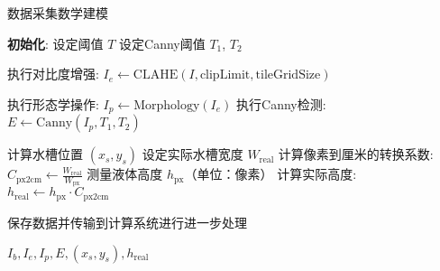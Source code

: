 \documentclass[UTF8,a4paper]{article}
\begin{document}
\begin{algorithm}[H]
    \caption{数据采集数学建模}
    
    \textbf{初始化}:  
    设定阈值 $T$\;
    设定Canny阈值 $T_1$, $T_2$\;
    
    执行对比度增强:  
    $I_e \leftarrow \text{CLAHE}(I, \text{clipLimit}, \text{tileGridSize})$\;
    
    执行形态学操作:  
    $I_p \leftarrow \text{Morphology}(I_e)$\;
    执行Canny检测:  
    $E \leftarrow \text{Canny}(I_p, T_1, T_2)$\;
    
    计算水槽位置 $(x_s, y_s)$\;
    设定实际水槽宽度 $W_{\text{real}}$\;
    计算像素到厘米的转换系数:  
    $C_{\text{px2cm}} \leftarrow \frac{W_{\text{real}}}{W_{\text{px}}}$\;
    测量液体高度 $h_{\text{px}}$（单位：像素）\;
    计算实际高度:  
    $h_{\text{real}} \leftarrow h_{\text{px}} \cdot C_{\text{px2cm}}$\;
    
    保存数据并传输到计算系统进行进一步处理\;
    
    \Return $I_b, I_e, I_p, E, (x_s, y_s), h_{\text{real}}$\;
\end{algorithm}
\end{document}
